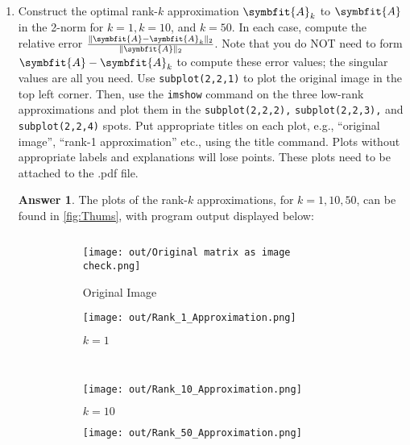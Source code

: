 \documentclass{article}
\theoremstyle{definition}
\newtheorem*{answer}{Answer}
\newcommand{\mat}[1]{\symbfit{#1}}
\begin{document}
\begin{enumerate}[leftmargin=\labelsep]
\begin{enumerate}
		      \item Construct the optimal rank-\(k\) approximation \(\mat{A}_k\) to \(\mat{A}\) in the 2-norm for \(k = 1, k = 10\), and \(k = 50\). In each case, compute the relative error \(\frac{\|\mat{A} - \mat{A}_k\|_2}{\|\mat{A}\|_2}\). Note that you do NOT need to form \(\mat{A} - \mat{A}_k\) to compute these error values; the singular values are all you need. Use \texttt{subplot(2,2,1)} to plot the original image in the top left corner. Then, use the \texttt{imshow} command on the three low-rank approximations and plot them in the \texttt{subplot(2,2,2),} \texttt{subplot(2,2,3),} and \texttt{subplot(2,2,4)} spots. Put appropriate titles on each plot, e.g., ``original image'', ``rank-1 approximation'' etc., using the title command. Plots without appropriate labels and explanations will lose points. These plots need to be attached to the .pdf file.
		            \begin{answer} The plots of the rank-\(k\) approximations, for \(k=1,10,50\), can be found in \cref{fig:Thums}, with program output displayed below: 
						\begin{mdframed}[backgroundcolor=lightgray] 
				            \inputminted{text}{out/output.txt}
			            \end{mdframed}
			            \begin{figure}[H]
				            \centering
				            \begin{subfigure}{0.225\textwidth}
					            \centering
					            \texttt{[image: out/Original matrix as image check.png]}
					            \caption{Original Image}\label{fig:ogThumb}
				            \end{subfigure}\qquad
				            \begin{subfigure}{0.225\textwidth}
					            \centering
					            \texttt{[image: out/Rank\_1\_Approximation.png]}
					            \caption{\(k=1\)}\label{fig:Thumb1}
				            \end{subfigure}\\
				            \begin{subfigure}{0.225\textwidth}
					            \centering
					            \texttt{[image: out/Rank\_10\_Approximation.png]}
					            \caption{\(k=10\)}\label{fig:Thumb10}
				            \end{subfigure}\qquad
				            \begin{subfigure}{0.225\textwidth}
					            \centering
					            \texttt{[image: out/Rank\_50\_Approximation.png]}

\end{subfigure}
\end{figure}
\end{answer}
\end{enumerate}
\end{enumerate}
\end{document}
